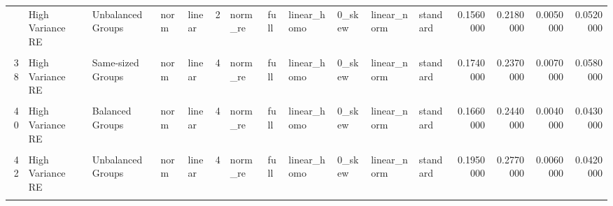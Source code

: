 \documentclass[12pt]{article}
\begin{document}
\begin{table}
{\begin{tabular}[t]{rllllrllllllrrrr}
\addlinespace
36 & High Variance RE & Unbalanced Groups & norm & linear & 2 & norm\_re & full & linear\_homo & 0\_skew & linear\_norm & standard & 0.1560000 & 0.2180000 & 0.0050000 & 0.0520000\\
\cellcolor{gray!6}{37} & \cellcolor{gray!6}{High Variance Error} & \cellcolor{gray!6}{Same-sized Groups} & \cellcolor{gray!6}{norm} & \cellcolor{gray!6}{linear} & \cellcolor{gray!6}{4} & \cellcolor{gray!6}{norm\_re} & \cellcolor{gray!6}{full} & \cellcolor{gray!6}{linear\_homo} & \cellcolor{gray!6}{0\_skew} & \cellcolor{gray!6}{linear\_norm} & \cellcolor{gray!6}{standard} & \cellcolor{gray!6}{0.0540000} & \cellcolor{gray!6}{0.1500000} & \cellcolor{gray!6}{0.1680000} & \cellcolor{gray!6}{0.0420000}\\
38 & High Variance RE & Same-sized Groups & norm & linear & 4 & norm\_re & full & linear\_homo & 0\_skew & linear\_norm & standard & 0.1740000 & 0.2370000 & 0.0070000 & 0.0580000\\
\cellcolor{gray!6}{39} & \cellcolor{gray!6}{High Variance Error} & \cellcolor{gray!6}{Balanced Groups} & \cellcolor{gray!6}{norm} & \cellcolor{gray!6}{linear} & \cellcolor{gray!6}{4} & \cellcolor{gray!6}{norm\_re} & \cellcolor{gray!6}{full} & \cellcolor{gray!6}{linear\_homo} & \cellcolor{gray!6}{0\_skew} & \cellcolor{gray!6}{linear\_norm} & \cellcolor{gray!6}{standard} & \cellcolor{gray!6}{0.0540000} & \cellcolor{gray!6}{0.1620000} & \cellcolor{gray!6}{0.1850000} & \cellcolor{gray!6}{0.0390000}\\
40 & High Variance RE & Balanced Groups & norm & linear & 4 & norm\_re & full & linear\_homo & 0\_skew & linear\_norm & standard & 0.1660000 & 0.2440000 & 0.0040000 & 0.0430000\\
\addlinespace
\cellcolor{gray!6}{41} & \cellcolor{gray!6}{High Variance Error} & \cellcolor{gray!6}{Unbalanced Groups} & \cellcolor{gray!6}{norm} & \cellcolor{gray!6}{linear} & \cellcolor{gray!6}{4} & \cellcolor{gray!6}{norm\_re} & \cellcolor{gray!6}{full} & \cellcolor{gray!6}{linear\_homo} & \cellcolor{gray!6}{0\_skew} & \cellcolor{gray!6}{linear\_norm} & \cellcolor{gray!6}{standard} & \cellcolor{gray!6}{0.0440000} & \cellcolor{gray!6}{0.1570000} & \cellcolor{gray!6}{0.1420000} & \cellcolor{gray!6}{0.0450000}\\
42 & High Variance RE & Unbalanced Groups & norm & linear & 4 & norm\_re & full & linear\_homo & 0\_skew & linear\_norm & standard & 0.1950000 & 0.2770000 & 0.0060000 & 0.0420000\\
\cellcolor{gray!6}{43} & \cellcolor{gray!6}{High Variance Error} & \cellcolor{gray!6}{Same-sized Groups} & \cellcolor{gray!6}{norm} & \cellcolor{gray!6}{linear} & \cellcolor{gray!6}{8} & \cellcolor{gray!6}{norm\_re} & \cellcolor{gray!6}{full} & \cellcolor{gray!6}{linear\_homo} & \cellcolor{gray!6}{0\_skew} & \cellcolor{gray!6}{linear\_norm} & \cellcolor{gray!6}{standard} & \cellcolor{gray!6}{0.0570000} & \cellcolor{gray!6}{0.2320000} & \cellcolor{gray!6}{0.2670000} & \cellcolor{gray!6}{0.0420000}\\

\end{tabular}}
\end{table}
\end{document}
